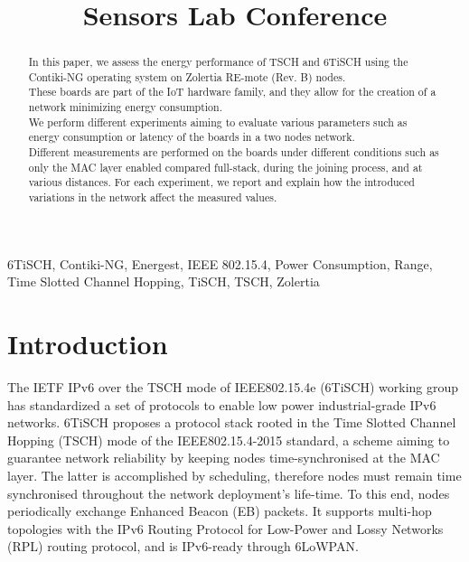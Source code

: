 \documentclass[conference]{IEEEtran}
\begin{document}
\title{Sensors Lab Conference}

\author{
\and
}

\maketitle

\begin{abstract}
In this paper, we assess the energy performance of TSCH and 6TiSCH using the Contiki-NG operating system on Zolertia RE-mote (Rev. B) nodes.\\
These boards are part of the IoT hardware family, and they allow for the creation of a network minimizing energy consumption.\\
We perform different experiments aiming to evaluate various parameters such as energy consumption or latency of the boards in a two nodes network.\\
Different measurements are performed on the boards under different conditions such as only the MAC layer enabled compared full-stack, during the joining process, and at various distances.
For each experiment, we report and explain how the introduced variations in the network affect the measured values.
\end{abstract}

\begin{IEEEkeywords}
6TiSCH, Contiki-NG, Energest, IEEE 802.15.4, Power Consumption, Range, Time Slotted Channel Hopping, TiSCH, TSCH, Zolertia
\end{IEEEkeywords}

\section{Introduction}
The IETF IPv6 over the TSCH mode of IEEE802.15.4e (6TiSCH) working group has standardized a set of protocols to enable low power industrial-grade IPv6 networks. 6TiSCH proposes a protocol stack rooted in the Time Slotted Channel Hopping (TSCH) mode of the IEEE802.15.4-2015 standard, a scheme aiming to guarantee network reliability by keeping nodes time-synchronised at the MAC layer. The latter is accomplished by scheduling, therefore nodes must remain time synchronised throughout the network deployment’s life-time. To this end, nodes periodically exchange Enhanced Beacon (EB) packets\cite{6tischDef}. It supports multi-hop topologies with the IPv6 Routing Protocol for Low-Power and Lossy Networks (RPL) routing protocol, and is IPv6-ready through 6LoWPAN\cite{6tischDef}.
\end{document}
